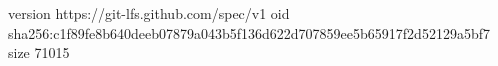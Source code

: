 version https://git-lfs.github.com/spec/v1
oid sha256:c1f89fe8b640deeb07879a043b5f136d622d707859ee5b65917f2d52129a5bf7
size 71015
